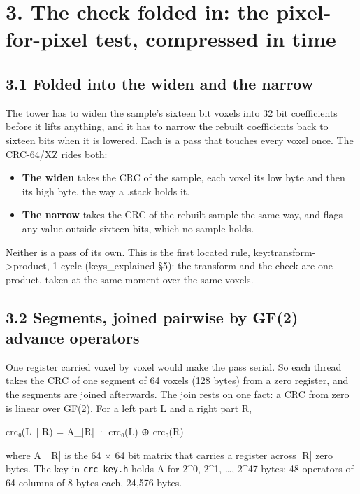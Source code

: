 \section{\texorpdfstring{3. The check folded in: the pixel-for-pixel test, compressed in time}{3. The check folded in: the pixel-for-pixel test, compressed in time}}

\subsection{\texorpdfstring{3.1 Folded into the widen and the narrow}{3.1 Folded into the widen and the narrow}}

The tower has to widen the sample's sixteen bit voxels into 32 bit coefficients before it lifts anything, and it has to narrow the rebuilt coefficients back to sixteen bits when it is lowered. Each is a pass that touches every voxel once. The CRC-64/XZ rides both:

\begin{itemize}
\item \textbf{The widen} takes the CRC of the sample, each voxel its low byte and then its high byte, the way a .stack holds it.
\item \textbf{The narrow} takes the CRC of the rebuilt sample the same way, and flags any value outside sixteen bits, which no sample holds.
\end{itemize}

Neither is a pass of its own. This is the first located rule, key:transform->product, 1 cycle (keys\_\allowbreak{}explained §5): the transform and the check are one product, taken at the same moment over the same voxels.

\subsection{\texorpdfstring{3.2 Segments, joined pairwise by GF(2) advance operators}{3.2 Segments, joined pairwise by GF(2) advance operators}}

One register carried voxel by voxel would make the pass serial. So each thread takes the CRC of one segment of 64 voxels (128 bytes) from a zero register, and the segments are joined afterwards. The join rests on one fact: a CRC from zero is linear over GF(2). For a left part L and a right part R,

crc₀(L ‖ R)  =  A\_\allowbreak{}|R| · crc₀(L)  ⊕  crc₀(R)

where A\_\allowbreak{}|R| is the 64 × 64 bit matrix that carries a register across |R| zero bytes. The key in \texttt{crc\_\allowbreak{}key.\allowbreak{}h} holds A for 2\textasciicircum{}0, 2\textasciicircum{}1, …, 2\textasciicircum{}47 bytes: 48 operators of 64 columns of 8 bytes each, 24,576 bytes.

